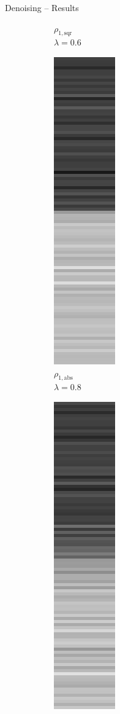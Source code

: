 \documentclass[t]{beamer}
\begin{document}
\begin{frame}{Denoising -- Results}
\begin{figure}[t]
\begin{subfigure}[t]{0.08\textwidth}
				\tiny $\rho_{1,\text{sqr}}$\\[2px]
				\tiny $\lambda = 0.6$
			\end{subfigure}
			\begin{subfigure}[t]{0.08\textwidth}
				\includegraphics[scale=0.25]{../paper/pictures/denoising/signal/ipiano_absolute_08.png}\\
				\tiny $\rho_{1,\text{abs}}$\\[2px]
				\tiny $\lambda = 0.8$		
			\end{subfigure}
			\begin{subfigure}[t]{0.08\textwidth}
			\includegraphics[scale=0.25]{../paper/pictures/denoising/signal/ipiano_squared_08.png}\\

\end{subfigure}
\end{figure}
\end{frame}
\end{document}
